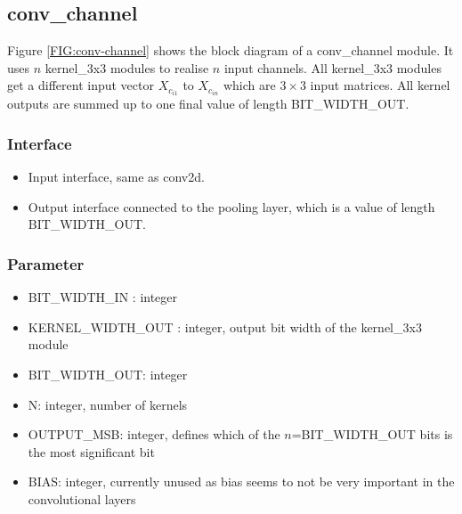 \subsection{conv\_channel}

Figure \ref{FIG:conv-channel} shows the block diagram of a conv\_channel module. It uses $n$ kernel\_3x3 modules to realise $n$ input channels. 
All kernel\_3x3 modules get a different input vector $X_{c_{i1}}$ to $X_{c_{in}}$ which are $3 \times 3$ input matrices. All kernel outputs are summed up
to one final value of length BIT\_WIDTH\_OUT.
\subsubsection{Interface}
\begin{itemize}
	\item Input interface, same as conv2d.
	\item Output interface connected to the pooling layer, which is a value of length BIT\_WIDTH\_OUT.
\end{itemize}
\subsubsection{Parameter}
\begin{itemize}
 	\item BIT\_WIDTH\_IN : integer
 	\item KERNEL\_WIDTH\_OUT : integer, output bit width of the kernel\_3x3 module
 	\item BIT\_WIDTH\_OUT: integer
 	\item N: integer, number of kernels
 	\item OUTPUT\_MSB: integer, defines which of the $n$=BIT\_WIDTH\_OUT bits is the most significant bit
 	\item BIAS: integer, currently unused as bias seems to not be very important in the convolutional layers
\end{itemize}